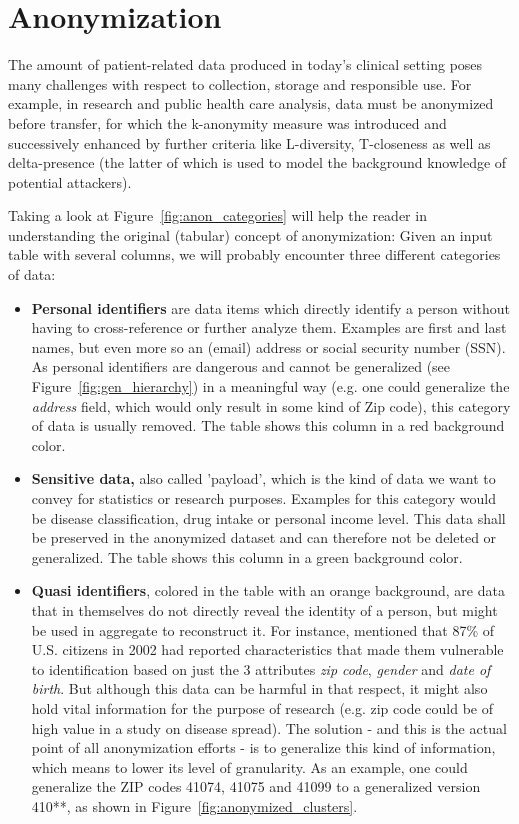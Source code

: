 	
	
	\section{Anonymization}
	\label{sect:app_snonymization}
	
	The amount of patient-related data produced in today’s clinical setting poses many challenges with respect to collection, storage and responsible use. For example, in research and public health care analysis, data must be anonymized before transfer, for which the k-anonymity measure was introduced and successively enhanced by further criteria like L-diversity, T-closeness as well as delta-presence (the latter of which is used to model the background knowledge of potential attackers).
	
	Taking a look at Figure~\ref{fig:anon_categories} will help the reader in understanding the original (tabular) concept of anonymization: Given an input table with several columns, we will probably encounter three different categories of data:
	
	\begin{itemize}
		\item \textbf{Personal identifiers} are data items which directly identify a person without having to cross-reference or further analyze them. Examples are first and last names, but even more so an (email) address or social security number (SSN). As personal identifiers are dangerous and cannot be generalized (see Figure~\ref{fig:gen_hierarchy}) in a meaningful way (e.g. one could generalize the \textit{address} field, which would only result in some kind of Zip code), this category of data is usually removed. The table shows this column in a red background color.
		\item \textbf{Sensitive data,} also called 'payload', which is the kind of data we want to convey for statistics or research purposes. Examples for this category would be disease classification, drug intake or personal income level. This data shall be preserved in the anonymized dataset and can therefore not be deleted or generalized. The table shows this column in a green background color.
		\item \textbf{Quasi identifiers}, colored in the table with an orange background, are data that in themselves do not directly reveal the identity of a person, but might be used in aggregate to reconstruct it. For instance, \citep{sweeney2002k} mentioned that 87\% of U.S. citizens in 2002 had reported characteristics that made them vulnerable to identification based on just the 3 attributes \textit{zip code}, \textit{gender} and \textit{date of birth}. But although this data can be harmful in that respect, it might also hold vital information for the purpose of research (e.g. zip code could be of high value in a study on disease spread). The solution - and this is the actual point of all anonymization efforts - is to generalize this kind of information, which means to lower its level of granularity. As an example, one could generalize the ZIP codes 41074, 41075 and 41099 to a generalized version 410**, as shown in Figure~\ref{fig:anonymized_clusters}.
	\end{itemize}
	
